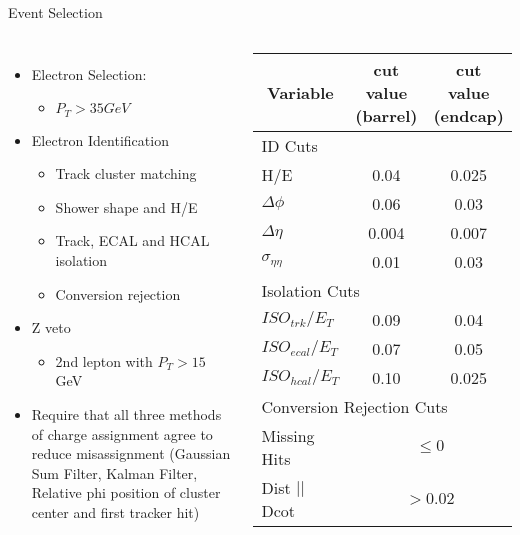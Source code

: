 \documentclass[t, 8pt]{beamer}
\begin{document}
\begin{frame}{Event Selection}
  \begin{columns}[c]
  \begin{itemize}
    \item Electron Selection:
    \begin{itemize}
      \item $P_T > 35 GeV$
    \end{itemize}
    \item Electron Identification
    \begin{itemize}
      \item Track cluster matching
      \item Shower shape and H/E
      \item Track, ECAL and HCAL isolation
      \item Conversion rejection
    \end{itemize}
    \item Z veto
    \begin{itemize}
      \item 2nd lepton with $P_T > 15$ GeV
    \end{itemize}
    \item Require that all three methods of charge assignment agree to reduce
    misassignment (Gaussian Sum Filter, Kalman Filter, Relative phi position of
    cluster center and first tracker hit)
  \end{itemize}
    \tiny{
  \begin{center}
  \begin{table}[htbp]
    \begin{tabular}{|lcc|} \hline
      \multicolumn{1}{|c}{Variable} & \multicolumn{1}{c}{cut value (barrel)}& \multicolumn{1}{c|}{cut value (endcap)}\\
        \hline   \hline
       \multicolumn{3}{|l|}{ID Cuts}\\ \hline
        H/E & 0.04 & 0.025 \\
        $\Delta\phi$ & 0.06 & 0.03 \\
        $\Delta\eta$ & 0.004 & 0.007  \\
        $\sigma_{\eta\eta}$ & 0.01 & 0.03 \\ \hline
      \multicolumn{3}{|l|}{Isolation Cuts}\\ \hline
       $ISO_{trk} / E_T $  & 0.09 & 0.04 \\
       $ISO_{ecal}/ E_T$  & 0.07 & 0.05 \\
       $ISO_{hcal}/ E_T$  & 0.10 & 0.025 \\ \hline
      \multicolumn{3}{|l|}{Conversion Rejection Cuts}\\ \hline
       Missing Hits  & \multicolumn{2}{c|}{$\leq 0$}\\
       Dist $||$ Dcot   & \multicolumn{2}{c|}{$>0.02$}\\
      \hline
    \end{tabular}
 \end{table}




\end{center}}
\end{columns}
\end{frame}
\end{document}
